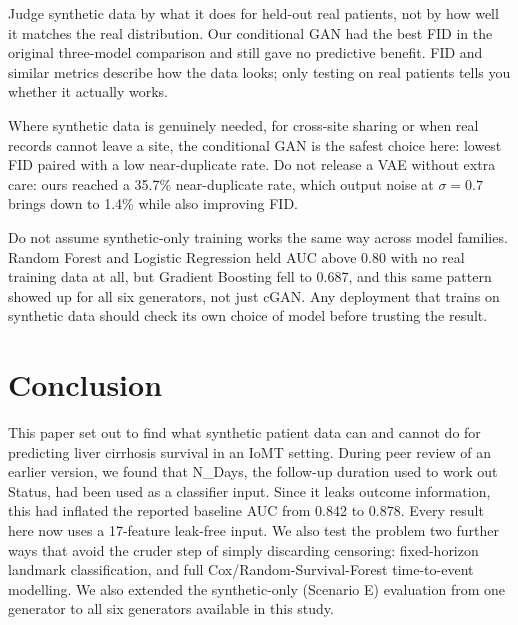 \documentclass[journal]{IEEEtran}
\begin{document}
Judge synthetic data by what it does for held-out real patients, not by how well it matches the real distribution. Our conditional GAN had the best FID in the original three-model comparison and still gave no predictive benefit. FID and similar metrics describe how the data looks; only testing on real patients tells you whether it actually works.

Where synthetic data is genuinely needed, for cross-site sharing or when real records cannot leave a site, the conditional GAN is the safest choice here: lowest FID paired with a low near-duplicate rate. Do not release a VAE without extra care: ours reached a 35.7\% near-duplicate rate, which output noise at $\sigma=0.7$ brings down to 1.4\% while also improving FID.

Do not assume synthetic-only training works the same way across model families. Random Forest and Logistic Regression held AUC above 0.80 with no real training data at all, but Gradient Boosting fell to 0.687, and this same pattern showed up for all six generators, not just cGAN. Any deployment that trains on synthetic data should check its own choice of model before trusting the result.

\section{Conclusion}
\label{sec:conclusion}

This paper set out to find what synthetic patient data can and cannot do for predicting liver cirrhosis survival in an IoMT setting. During peer review of an earlier version, we found that N\_Days, the follow-up duration used to work out Status, had been used as a classifier input. Since it leaks outcome information, this had inflated the reported baseline AUC from 0.842 to 0.878. Every result here now uses a 17-feature leak-free input. We also test the problem two further ways that avoid the cruder step of simply discarding censoring: fixed-horizon landmark classification, and full Cox/Random-Survival-Forest time-to-event modelling. We also extended the synthetic-only (Scenario E) evaluation from one generator to all six generators available in this study.
\end{document}
